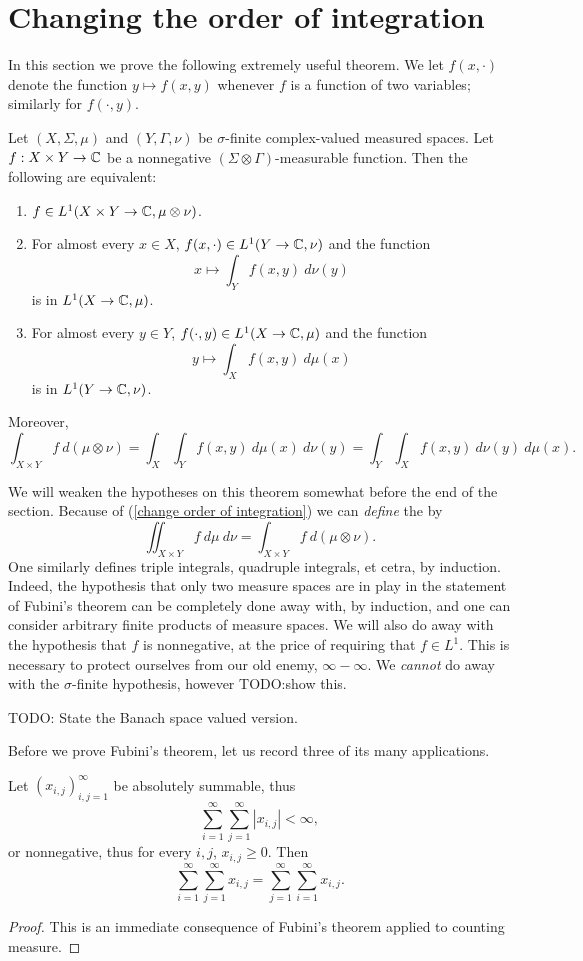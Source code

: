 \section{Changing the order of integration}
In this section we prove the following extremely useful theorem.
We let $f(x, \cdot)$ denote the function $y \mapsto f(x, y)$ whenever $f$ is a function of two variables; similarly for $f(\cdot, y)$.
\begin{theorem}[Fubini]
Let $(X, \Sigma, \mu)$ and $(Y, \Gamma, \nu)$ be $\sigma$-finite complex-valued measured spaces.
Let $f: X \times Y \to \mathbb{C}$ be a nonnegative $(\Sigma \otimes \Gamma)$-measurable function.
Then the following are equivalent:
\begin{enumerate}
\item $f \in L^1(X \times Y \to \mathbb{C}, \mu \otimes \nu)$.
\item For almost every $x \in X$, $f(x, \cdot) \in L^1(Y \to \mathbb{C}, \nu)$ and the function
$$x \mapsto \int_Y f(x, y)~d\nu(y)$$
is in $L^1(X \to \mathbb{C}, \mu)$.
\item For almost every $y \in Y$, $f(\cdot, y) \in L^1(X \to \mathbb{C}, \mu)$ and the function
$$y \mapsto \int_X f(x, y)~d\mu(x)$$
is in $L^1(Y \to \mathbb{C}, \nu)$.
\end{enumerate}
Moreover,
\begin{equation}
\label{change order of integration}
\int_{X \times Y} f~d(\mu \otimes \nu) = \int_X \int_Y f(x, y) ~d\mu(x)~d\nu(y) = \int_Y \int_X f(x, y) ~d\nu(y) ~d\mu(x).
\end{equation}
\end{theorem}
We will weaken the hypotheses on this theorem somewhat before the end of the section.
Because of (\ref{change order of integration}) we can \emph{define} the  by
$$\iint_{X \times Y} f ~d\mu ~d\nu = \int_{X \times Y} f~d(\mu \otimes \nu).$$
One similarly defines triple integrals, quadruple integrals, et cetra, by induction.
Indeed, the hypothesis that only two measure spaces are in play in the statement of Fubini's theorem can be completely done away with, by induction, and one can consider arbitrary finite products of measure spaces.
We will also do away with the hypothesis that $f$ is nonnegative, at the price of requiring that $f \in L^1$.
This is necessary to protect ourselves from our old enemy, $\infty - \infty$.
We \emph{cannot} do away with the $\sigma$-finite hypothesis, however TODO:show this.

TODO: State the Banach space valued version.

Before we prove Fubini's theorem, let us record three of its many applications.
\begin{corollary}
Let $(x_{i,j})_{i,j=1}^\infty$ be absolutely summable, thus
$$\sum_{i=1}^\infty \sum_{j=1}^\infty |x_{i,j}| < \infty,$$
or nonnegative, thus for every $i,j$, $x_{i,j} \geq 0$. Then
$$\sum_{i=1}^\infty \sum_{j=1}^\infty x_{i,j} = \sum_{j=1}^\infty \sum_{i=1}^\infty x_{i,j}.$$
\end{corollary}
\begin{proof}
This is an immediate consequence of Fubini's theorem applied to counting measure.
\end{proof}

